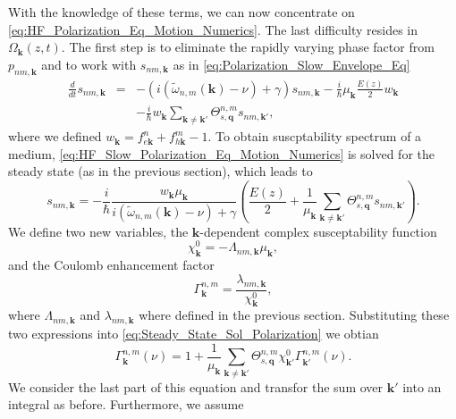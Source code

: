 With the knowledge of these terms, we can now concentrate on \ref{eq:HF_Polarization_Eq_Motion_Numerics}.
The last difficulty resides in $\Omega_{\mathbf{k}}(z,t)$. The first
step is to eliminate the rapidly varying phase factor from $p_{nm,\mathbf{k}}$
and to work with $s_{nm,\mathbf{k}}$ as in \ref{eq:Polarization_Slow_Envelope_Eq}\begin{eqnarray}
\frac{d}{dt}s_{nm,\mathbf{k}} & = & -\left(i\left(\tilde{\omega}_{n,m}(\mathbf{k})-\nu\right)+\gamma\right)s_{nm,\mathbf{k}}-\frac{i}{\hbar}\mu_{\mathbf{k}}\frac{E(z)}{2}w_{\mathbf{k}}\nonumber \\
 &  & -\frac{i}{\hbar}w_{\mathbf{k}}\sum_{\mathbf{k}\neq\mathbf{k}'}\Theta_{s,\mathbf{q}}^{n,m}s_{nm,\mathbf{k}'},\label{eq:HF_Slow_Polarization_Eq_Motion_Numerics}\end{eqnarray}
where we defined $w_{\mathbf{k}}=f_{e\mathbf{k}}^{n}+f_{h\mathbf{k}}^{m}-1$.
To obtain suscptability spectrum of a medium, \ref{eq:HF_Slow_Polarization_Eq_Motion_Numerics}
is solved for the steady state (as in the previous section), which
leads to \begin{equation}
s_{nm,\mathbf{k}}=-\frac{i}{\hbar}\frac{w_{\mathbf{k}}\mu_{\mathbf{k}}}{i\left(\tilde{\omega}_{n,m}(\mathbf{k})-\nu\right)+\gamma}\left(\frac{E(z)}{2}+\frac{1}{\mu_{\mathbf{k}}}\sum_{\mathbf{k}\neq\mathbf{k}'}\Theta_{s,\mathbf{q}}^{n,m}s_{nm,\mathbf{k}'}\right).\label{eq:Steady_State_Sol_Polarization}\end{equation}
We define two new variables, the $\mathbf{k}$-dependent complex susceptability
function \begin{equation}
\chi_{\mathbf{k}}^{0}=-\Lambda_{nm,\mathbf{k}}\mu_{\mathbf{k}},\end{equation}
and the Coulomb enhancement factor\begin{equation}
\Gamma_{\mathbf{k}}^{n,m}=\frac{\lambda_{nm,\mathbf{k}}}{\chi_{\mathbf{k}}^{0}},\end{equation}
where $\Lambda_{nm,\mathbf{k}}$ and $\lambda_{nm,\mathbf{k}}$ where
defined in the previous section. Substituting these two expressions
into \ref{eq:Steady_State_Sol_Polarization} we obtian\begin{equation}
\Gamma_{\mathbf{k}}^{n,m}(\nu)=1+\frac{1}{\mu_{\mathbf{k}}}\sum_{\mathbf{k}\neq\mathbf{k}'}\Theta_{s,\mathbf{q}}^{n,m}\chi_{\mathbf{k}'}^{0}\Gamma_{\mathbf{k}'}^{n,m}(\nu).\label{eq:Coulomb_Enhancement_Factor_1}\end{equation}
We consider the last part of this equation and transfor the sum over
$\mathbf{k}'$ into an integral as before. Furthermore, we assume
